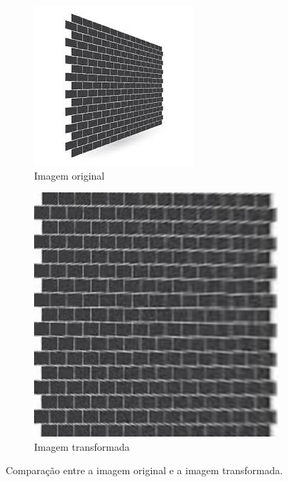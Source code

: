 \documentclass[sigconf,nonacm]{acmart}
\begin{document}
\begin{figure}[H]
  \centering
  \begin{subfigure}[b]{0.45\linewidth}
    \centering
    \includegraphics[width=\linewidth]{resources/input2.jpg}
    \caption{Imagem original}
    \label{fig:three}
  \end{subfigure}
  \hfill
  \begin{subfigure}[b]{0.45\linewidth}
    \centering
    \includegraphics[width=\linewidth]{resources/output2.jpg}
    \caption{Imagem transformada}
    \label{fig:four}
  \end{subfigure}
  \caption{Comparação entre a imagem original e a imagem transformada.}
  \label{fig:resultados}
\end{figure}
\end{document}
